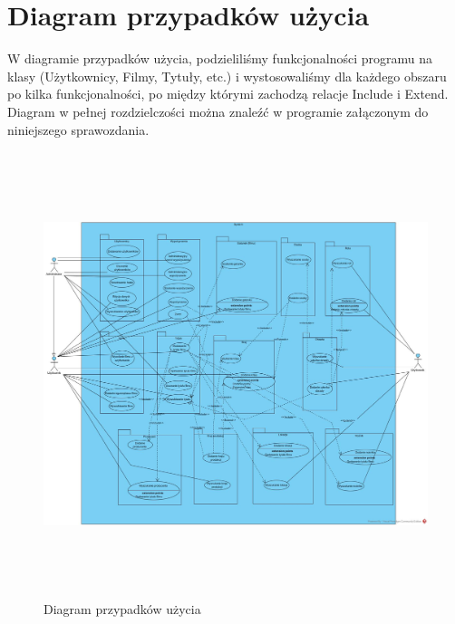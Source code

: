 \documentclass{article}
\begin{document}
	\section{Diagram przypadków użycia}
	W diagramie przypadków użycia, podzieliliśmy funkcjonalności programu na klasy (Użytkownicy, Filmy, Tytuły, etc.) i wystosowaliśmy dla każdego obszaru po kilka funkcjonalności, po między którymi zachodzą relacje Include i Extend. Diagram w pełnej rozdzielczości można znaleźć w programie załączonym do niniejszego sprawozdania.
	\begin{figure}[!ht]	
		\centering
		\includegraphics[height=13cm]{PU.jpg}
		\caption{Diagram przypadków użycia}
		\label{fig:obrazek 1}
	\end{figure}
\newpage
\end{document}
